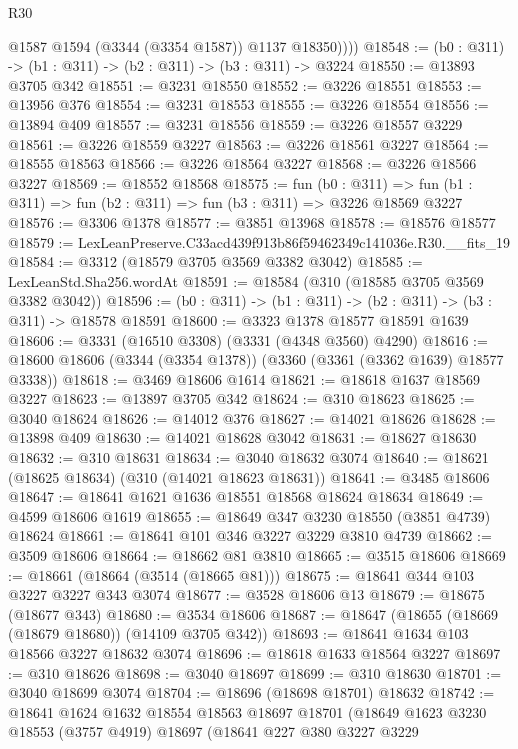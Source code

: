 \begin{lexlean}{R30}
\begin{coremodule}
            @1587
            @1594
            (@3344 (@3354 @1587))
            @1137
            @18350))))
@18548 := (b0 : @311) -> (b1 : @311) -> (b2 : @311) -> (b3 : @311) -> @3224
@18550 := @13893 @3705 @342
@18551 := @3231 @18550
@18552 := @3226 @18551
@18553 := @13956 @376
@18554 := @3231 @18553
@18555 := @3226 @18554
@18556 := @13894 @409
@18557 := @3231 @18556
@18559 := @3226 @18557 @3229
@18561 := @3226 @18559 @3227
@18563 := @3226 @18561 @3227
@18564 := @18555 @18563
@18566 := @3226 @18564 @3227
@18568 := @3226 @18566 @3227
@18569 := @18552 @18568
@18575 := fun (b0 : @311) =>
  fun (b1 : @311) => fun (b2 : @311) => fun (b3 : @311) => @3226 @18569 @3227
@18576 := @3306 @1378
@18577 := @3851 @13968
@18578 := @18576 @18577
@18579 := LexLeanPreserve.C33acd439f913b86f59462349c141036e.R30.__fits_19
@18584 := @3312 (@18579 @3705 @3569 @3382 @3042)
@18585 := LexLeanStd.Sha256.wordAt
@18591 := @18584 (@310 (@18585 @3705 @3569 @3382 @3042))
@18596 := (b0 : @311) -> (b1 : @311) -> (b2 : @311) -> (b3 : @311) -> @18578 @18591
@18600 := @3323 @1378 @18577 @18591 @1639
@18606 := @3331 (@16510 @3308) (@3331 (@4348 @3560) @4290)
@18616 := @18600 @18606 (@3344 (@3354 @1378)) (@3360 (@3361 (@3362 @1639) @18577 @3338))
@18618 := @3469 @18606 @1614
@18621 := @18618 @1637 @18569 @3227
@18623 := @13897 @3705 @342
@18624 := @310 @18623
@18625 := @3040 @18624
@18626 := @14012 @376
@18627 := @14021 @18626
@18628 := @13898 @409
@18630 := @14021 @18628 @3042
@18631 := @18627 @18630
@18632 := @310 @18631
@18634 := @3040 @18632 @3074
@18640 := @18621 (@18625 @18634) (@310 (@14021 @18623 @18631))
@18641 := @3485 @18606
@18647 := @18641 @1621 @1636 @18551 @18568 @18624 @18634
@18649 := @4599 @18606 @1619
@18655 := @18649 @347 @3230 @18550 (@3851 @4739) @18624
@18661 := @18641 @101 @346 @3227 @3229 @3810 @4739
@18662 := @3509 @18606
@18664 := @18662 @81 @3810
@18665 := @3515 @18606
@18669 := @18661 (@18664 (@3514 (@18665 @81)))
@18675 := @18641 @344 @103 @3227 @3227 @343 @3074
@18677 := @3528 @18606 @13
@18679 := @18675 (@18677 @343)
@18680 := @3534 @18606
@18687 := @18647 (@18655 (@18669 (@18679 @18680)) (@14109 @3705 @342))
@18693 := @18641 @1634 @103 @18566 @3227 @18632 @3074
@18696 := @18618 @1633 @18564 @3227
@18697 := @310 @18626
@18698 := @3040 @18697
@18699 := @310 @18630
@18701 := @3040 @18699 @3074
@18704 := @18696 (@18698 @18701) @18632
@18742 := @18641
    @1624
    @1632
    @18554
    @18563
    @18697
    @18701
    (@18649
      @1623
      @3230
      @18553
      (@3757 @4919)
      @18697
      (@18641
        @227
        @380
        @3227
        @3229

\end{coremodule}
\end{lexlean}
